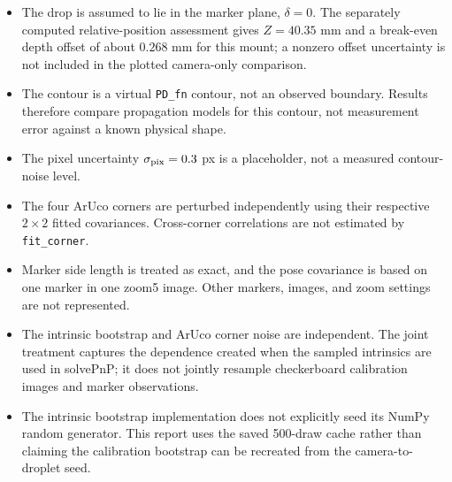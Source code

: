 \documentclass[11pt]{article}
\begin{document}
\begin{itemize}
  \item The drop is assumed to lie in the marker plane,
  \(\delta=0\). The separately computed relative-position assessment gives
  \(Z=40.35\) mm and a break-even depth offset of about \(0.268\) mm for this
  mount; a nonzero offset uncertainty is not included in the plotted
  camera-only comparison.
  \item The contour is a virtual \texttt{PD\_fn} contour, not an observed
  boundary. Results therefore compare propagation models for this contour,
  not measurement error against a known physical shape.
  \item The pixel uncertainty \(\sigma_{\rm pix}=0.3\) px is a placeholder,
  not a measured contour-noise level.
  \item The four ArUco corners are perturbed independently using their
  respective \(2\times2\) fitted covariances. Cross-corner correlations are
  not estimated by \texttt{fit\_corner}.
  \item Marker side length is treated as exact, and the pose covariance is
  based on one marker in one zoom5 image. Other markers, images, and zoom
  settings are not represented.
  \item The intrinsic bootstrap and ArUco corner noise are independent.
  The joint treatment captures the dependence created when the sampled
  intrinsics are used in solvePnP; it does not jointly resample checkerboard
  calibration images and marker observations.
  \item The intrinsic bootstrap implementation does not explicitly seed its
  NumPy random generator. This report uses the saved 500-draw cache rather
  than claiming the calibration bootstrap can be recreated from the
  camera-to-droplet seed.
\end{itemize}
\end{document}
